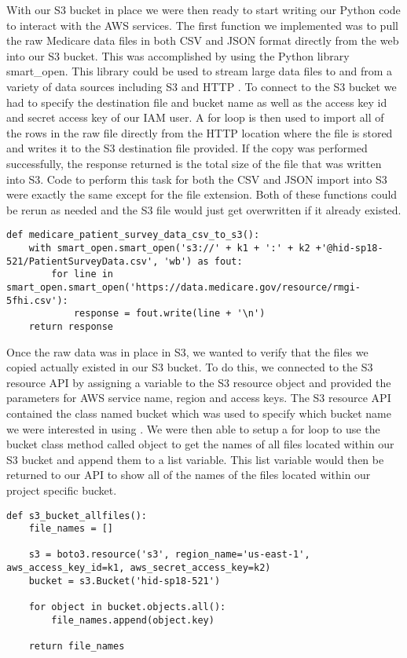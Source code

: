 With our S3 bucket in place we were then ready to start writing our Python 
code to interact with the AWS services. The first function we implemented was 
to pull the raw Medicare data files in both CSV and JSON format directly from 
the web into our S3 bucket. This was accomplished by using the Python library 
smart_open. This library could be used to stream large data files to and from 
a variety of data sources including S3 and HTTP \cite{hid-sp18-521-smartopen}. 
To connect to the S3 bucket we had to specify the destination file and bucket 
name as well as the access key id and secret access key of our IAM user. A for 
loop is then used to import all of the rows in the raw file directly from the 
HTTP location where the file is stored and writes it to the S3 destination 
file provided. If the copy was performed successfully, the response returned 
is the total size of the file that was written into S3. Code to perform this 
task for both the CSV and JSON import into S3 were exactly the same except for 
the file extension. Both of these functions could be rerun as needed and the 
S3 file would just get overwritten if it already existed. 

\begin{verbatim}
def medicare_patient_survey_data_csv_to_s3():
    with smart_open.smart_open('s3://' + k1 + ':' + k2 +'@hid-sp18-521/PatientSurveyData.csv', 'wb') as fout:
        for line in smart_open.smart_open('https://data.medicare.gov/resource/rmgi-5fhi.csv'):
            response = fout.write(line + '\n')
	return response
\end{verbatim}

Once the raw data was in place in S3, we wanted to verify that the files we 
copied actually existed in our S3 bucket. To do this, we connected to the S3 
resource API by assigning a variable to the S3 resource object and provided 
the parameters for AWS service name, region and access keys. The S3 resource 
API contained the class named bucket which was used to specify which bucket 
name we were interested in using \cite{hid-sp18-521-boto-bucket}. We were then 
able to setup a for loop to use the bucket class method called object to get 
the names of all files located within our S3 bucket and append them to a list 
variable. This list variable would then be returned to our API to show all of 
the names of the files located within our project specific bucket. 

\begin{verbatim}
def s3_bucket_allfiles():
    file_names = []

    s3 = boto3.resource('s3', region_name='us-east-1', aws_access_key_id=k1, aws_secret_access_key=k2)
    bucket = s3.Bucket('hid-sp18-521')

    for object in bucket.objects.all():
        file_names.append(object.key)

    return file_names
\end{verbatim}

